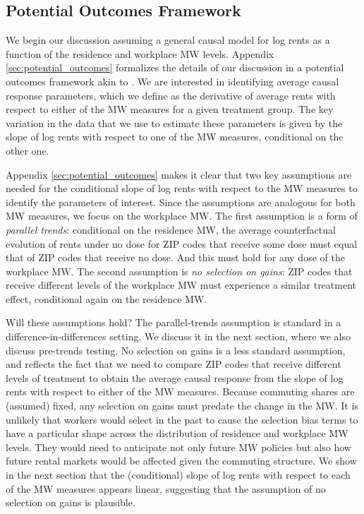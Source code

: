 
\subsection{Potential Outcomes Framework}

We begin our discussion assuming a general causal model for log rents as a 
function of the residence and workplace MW levels.
Appendix \ref{sec:potential_outcomes} formalizes the details of our discussion 
in a potential outcomes framework akin to \textcite{CallawayEtAl2021}.
We are interested in identifying average causal response parameters,
which we define as the derivative of average rents with respect to either
of the MW measures for a given treatment group.
The key variation in the data that we use to estimate these parameters is 
given by the slope of log rents with respect to one of the MW measures, 
conditional on the other one.

Appendix \ref{sec:potential_outcomes} makes it clear that two key assumptions 
are needed for the conditional slope of log rents with respect to the MW 
measures to identify the parameters of interest.
Since the assumptions are analogous for both MW measures, we focus on the 
workplace MW.
The first assumption is a form of \textit{parallel trends}: conditional on the 
residence MW, the average counterfactual evolution of rents under no dose for 
ZIP codes that receive some dose must equal that of ZIP codes that 
receive no dose.
And this must hold for any dose of the workplace MW.
The second assumption is \textit{no selection on gains}: ZIP codes that receive
different levels of the workplace MW must experience a similar treatment effect,
conditional again on the residence MW.

Will these assumptions hold?
The parallel-trends assumption is standard in a difference-in-differences 
setting.
We discuss it in the next section, where we also discuss pre-trends testing.
No selection on gains is a less standard assumption, and reflects the 
fact that we need to compare ZIP codes that receive different levels 
of treatment to obtain the average causal response from the slope of log 
rents with respect to either of the MW measures.
Because commuting shares are (assumed) fixed, any selection on gains must 
predate the change in the MW.
It is unlikely that workers would select in the past to cause the 
selection bias terms to have a particular shape across the distribution 
of residence and workplace MW levels.
They would need to anticipate not only future MW policies but also how 
future rental markets would be affected given the commuting structure.
We show in the next section that the (conditional) slope of log rents with 
respect to each of the MW measures appears linear, suggesting that the 
assumption of no selection on gains is plausible.

